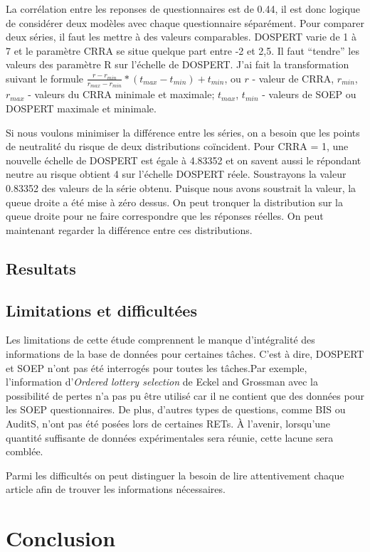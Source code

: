 \documentclass[12pt]{article}
\begin{document}
La corrélation entre les reponses de questionnaires est de 0.44, il est
donc logique de considérer deux modèles avec chaque questionnaire
séparément. Pour comparer deux séries, il faut les mettre à des valeurs
comparables. DOSPERT varie de 1 à 7 et le paramètre CRRA se situe
quelque part entre -2 et 2,5. Il faut ``tendre'' les valeurs des
paramètre R sur l'échelle de DOSPERT. J'ai fait la transformation
suivant le formule
\(\frac{r - r_{min}}{r_{max} - r_{min}} * (t_{max} - t_{min}) + t_{min}\),
ou \(r\) - valeur de CRRA, \(r_{min}\), \(r_{max}\) - valeurs du CRRA
minimale et maximale; \(t_{max}\), \(t_{min}\) - valeurs de SOEP ou
DOSPERT maximale et minimale.

Si nous voulons minimiser la différence entre les séries, on a besoin
que les points de neutralité du risque de deux distributions coïncident.
Pour CRRA = 1, une nouvelle échelle de DOSPERT est égale à 4.83352 et on
savent aussi le répondant neutre au risque obtient 4 sur l'échelle
DOSPERT réele. Soustrayons la valeur 0.83352 des valeurs de la série
obtenu. Puisque nous avons soustrait la valeur, la queue droite a été
mise à zéro dessus. On peut tronquer la distribution sur la queue droite
pour ne faire correspondre que les réponses réelles. On peut maintenant
regarder la différence entre ces distributions.

\subsection{Resultats}

\subsection{Limitations et difficultées}

Les limitations de cette étude comprennent le manque d'intégralité des
informations de la base de données pour certaines tâches. C'est à dire,
DOSPERT et SOEP n'ont pas été interrogés pour toutes les tâches.Par
exemple, l'information d'\emph{Ordered lottery selection} de Eckel and
Grossman avec la possibilité de pertes n'a pas pu être utilisé car il ne
contient que des données pour les SOEP questionnaires. De plus, d'autres
types de questions, comme BIS ou AuditS, n'ont pas été posées lors de
certaines RETs. À l'avenir, lorsqu'une quantité suffisante de données
expérimentales sera réunie, cette lacune sera comblée.

Parmi les difficultés on peut distinguer la besoin de lire attentivement
chaque article afin de trouver les informations nécessaires.

\section{Conclusion}

\label{sec:fifth}



\end{document}
